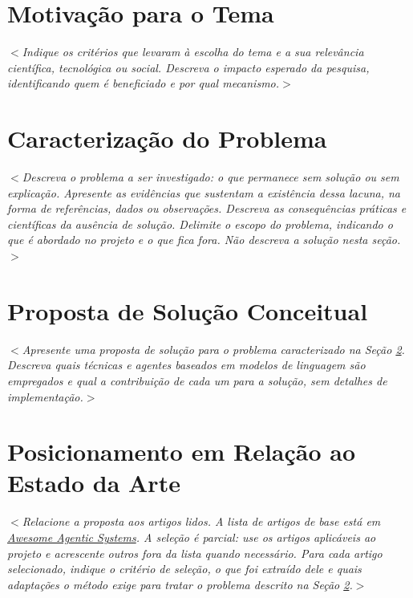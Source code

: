 \documentclass[12pt]{article}
\begin{document}
\section{Motivação para o Tema}
\label{sec:motivacao}

\textit{$<$Indique os critérios que levaram à escolha do tema e a sua relevância científica, tecnológica ou social. Descreva o impacto esperado da pesquisa, identificando quem é beneficiado e por qual mecanismo.$>$}


\section{Caracterização do Problema}
\label{sec:problema}

\textit{$<$Descreva o problema a ser investigado: o que permanece sem solução ou sem explicação. Apresente as evidências que sustentam a existência dessa lacuna, na forma de referências, dados ou observações. Descreva as consequências práticas e científicas da ausência de solução. Delimite o escopo do problema, indicando o que é abordado no projeto e o que fica fora. Não descreva a solução nesta seção.$>$}

\section{Proposta de Solução Conceitual}
\label{sec:solucao}

\textit{$<$Apresente uma proposta de solução para o problema caracterizado na Seção \ref{sec:problema}. Descreva quais técnicas e agentes baseados em modelos de linguagem são empregados e qual a contribuição de cada um para a solução, sem detalhes de implementação.$>$}


\section{Posicionamento em Relação ao Estado da Arte}
\label{sec:estado_da_arte}

\textit{$<$Relacione a proposta aos artigos lidos. A lista de artigos de base está em \href{https://juliodosreis.com/awesome-agenticsystems/}{Awesome Agentic Systems}. A seleção é parcial: use os artigos aplicáveis ao projeto e acrescente outros fora da lista quando necessário. Para cada artigo selecionado, indique o critério de seleção, o que foi extraído dele e quais adaptações o método exige para tratar o problema descrito na Seção \ref{sec:problema}.$>$}
\end{document}
